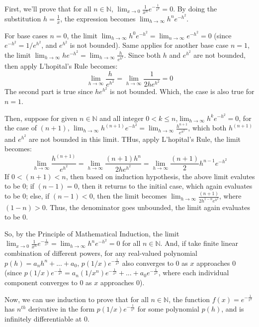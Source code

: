 \documentclass{article}
\begin{document}
First, we'll prove that for all $n\in\mathbb{N}$, $\lim_{x\rightarrow 0}\frac{1}{x^n}e^{-\frac{1}{x^2}}=0$.
By doing the substitution $h=\frac{1}{x}$, the expression becomes $\lim_{h\rightarrow\infty}h^ne^{-h^2}$.

For base cases $n=0$, the limit $\lim_{h\rightarrow \infty}h^0e^{-h^2} = \lim_{n\rightarrow\infty}e^{-h^2}=0$ (since $e^{-h^2}=1/e^{h^2}$, and $e^{h^2}$ is not bounded).
Same applies for another base case $n=1$, the limit $\lim_{h\rightarrow\infty}he^{-h^2} = \lim_{h\rightarrow\infty}\frac{h}{e^{h^2}}$. Since both $h$ and $e^{h^2}$ are not bounded, 
then apply L'hopital's Rule becomes:
$$\lim_{h\rightarrow\infty}\frac{h}{e^{h^2}}=\lim_{h\rightarrow\infty}\frac{1}{2he^{h^2}}=0$$
The second part is true since $he^{h^2}$ is not bounded. Which, the case is also true for $n=1$.

\hfill

Then, suppose for given $n\in\mathbb{N}$ and all integer $0< k\leq n$,$\lim_{h\rightarrow\infty}h^ke^{-h^2}=0$, for the case of $(n+1)$,
$\lim_{h\rightarrow\infty}h^{(n+1)}e^{-h^2}=\lim_{h\rightarrow\infty}\frac{h^{n+1}}{e^{h^2}}$, which both $h^{(n+1)}$ and $e^{h^2}$ are not bounded in this limit. THus, apply L'hopital's Rule, the limit becomes:
$$\lim_{h\rightarrow\infty}\frac{h^{(n+1)}}{e^{h^2}}=\lim_{h\rightarrow\infty}\frac{(n+1)h^n}{2he^{h^2}}=\lim_{h\rightarrow\infty}\frac{(n+1)}{2}h^{n-1}e^{-h^2}$$
If $0<(n+1)<n$, then based on induction hypothesis, the above limit evalutes to be $0$; 
if $(n-1)=0$, then it returns to the initial case, which again evaluates to be $0$;
else, if $(n-1)<0$, then the limit becomes $\lim_{h\rightarrow\infty}\frac{(n+1)}{2h^{1-n}e^{h^2}}$, where $(1-n)>0$. Thus, the denominator goes unbounded, the limit again evaluates to be $0$.

So, by the Principle of Mathematical Induction, the limit $\lim_{x\rightarrow 0}\frac{1}{x^n}e^{-\frac{1}{x^2}}=\lim_{h\rightarrow\infty}h^ne^{-h^2}=0$ for all $n\in\mathbb{N}$.
And, if take finite linear combination of different powers, for any real-valued polynomial $p(h)=a_nh^n+...+a_0$, $p(1/x)e^{-\frac{1}{x^2}}$ also converges to $0$ as $x$ approaches $0$
(since $p(1/x)e^{-\frac{1}{x^2}}=a_n(1/x^n)e^{-\frac{1}{x^2}}+...+a_0e^{-\frac{1}{x^2}}$, where each individual component converges to $0$ as $x$ approaches $0$).

\hfill

\hfill

Now, we can use induction to prove that for all $n\in\mathbb{N}$,
the function $f(x)=e^{-\frac{1}{x^2}}$ has $n^{th}$ derivative in the form $p(1/x)e^{-\frac{1}{x^2}}$ for some polynomial $p(h)$, and is infinitely differentiable at $0$.
\end{document}
